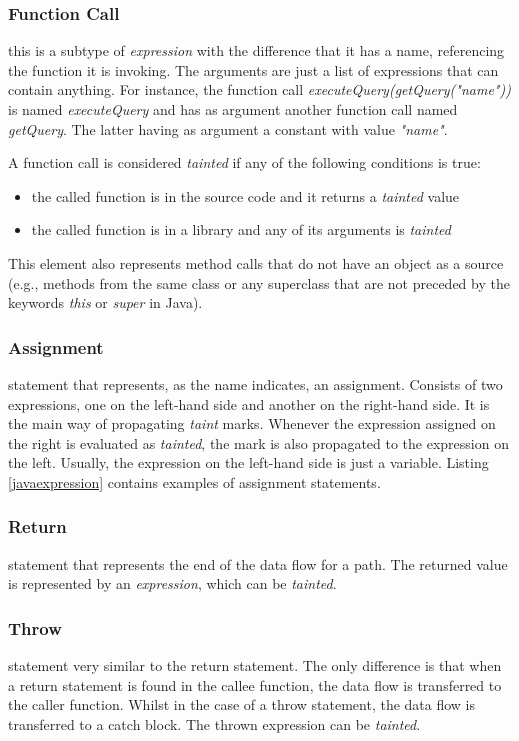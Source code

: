 \subsubsection{Function Call} this is a subtype of \textit{expression} with the difference that it has a name, referencing the function it is invoking. The arguments are just a list of expressions that can contain anything. For instance, the function call \textit{executeQuery(getQuery("name"))} is named \textit{executeQuery} and has as argument another function call named \textit{getQuery}. The latter having as argument a constant with value \textit{"name"}.

A function call is considered \textit{tainted} if any of the following conditions is true: 
\begin{itemize}
    \item the called function is in the source code and it returns a \textit{tainted} value
    \item the called function is in a library and any of its arguments is \textit{tainted}
\end{itemize}

This element also represents method calls that do not have an object as a source (e.g., methods from the same class or any superclass that are not preceded by the keywords \textit{this} or \textit{super} in Java).


\subsubsection{Assignment} statement that represents, as the name indicates, an assignment. Consists of two expressions, one on the left-hand side and another on the right-hand side. It is the main way of propagating \textit{taint} marks. Whenever the expression assigned on the right is evaluated as \textit{tainted}, the mark is also propagated to the expression on the left. Usually, the expression on the left-hand side is just a variable. Listing \ref{javaexpression} contains examples of assignment statements.


\subsubsection{Return} statement that represents the end of the data flow for a path. The returned value is represented by an \textit{expression}, which can be \textit{tainted}.


\subsubsection{Throw} statement very similar to the return statement. The only difference is that when a return statement is found in the callee function, the data flow is transferred to the caller function. Whilst in the case of a throw statement, the data flow is transferred to a catch block. The thrown expression can be \textit{tainted}.


